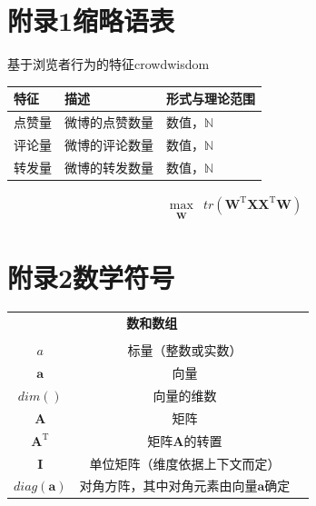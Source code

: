 \documentclass[a4paper,AutoFakeBold,oneside,12pt]{book}
\begin{document}
{}
\section*{附录1\quad{}缩略语表}

\begin{bupttable}{基于浏览者行为的特征}{crowdwisdom}
    \begin{tabular}{l|l|l}
		\hline \textbf{特征} & \textbf{描述} & \textbf{形式与理论范围}\\
		\hline 点赞量 & 微博的点赞数量 & 数值，$\mathbb{N}$ \\
		\hline 评论量 & 微博的评论数量 & 数值，$\mathbb{N}$ \\
		\hline 转发量 & 微博的转发数量 & 数值，$\mathbb{N}$ \\
		\hline
    \end{tabular}
\end{bupttable}

\begin{equation}
\label{PCA_goal}
\begin{aligned}
\max_{\substack{\bm{W}}}  &  tr(\bm{W}^\mathrm{T}\bm{X}\bm{X}^ \mathrm{T}\bm{W})
\end{aligned}
\end{equation}

{}
\section*{附录2\quad{}数学符号}
\begin{center}
	\begin{tabular}{ccc}
		\multicolumn{2}{c}{\textbf{数和数组}} \\
		\\
		$a$ & 标量（整数或实数）\\
		$\bm{a}$ & 向量\\
		$dim()$ & 向量的维数\\
		$\bm{A}$ & 矩阵\\
		$\bm{A}^\mathrm{T}$ & 矩阵$\textbf{A}$的转置\\
		$\bm{I}$ & 单位矩阵（维度依据上下文而定） \\
 		$diag(\bm{a})$ & 对角方阵，其中对角元素由向量$\bm{a}$确定 \\

	\end{tabular}
\end{center}
\end{document}
